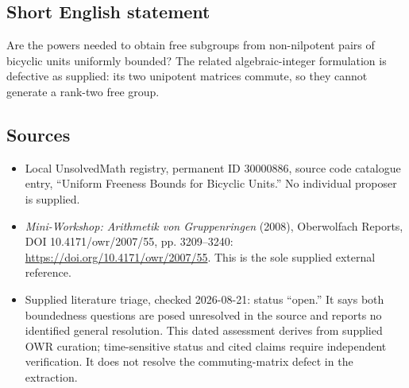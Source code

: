 \documentclass[11pt]{article}
\begin{document}
\subsection{Short English statement}
Are the powers needed to obtain free subgroups from non-nilpotent pairs of bicyclic units uniformly bounded? The related algebraic-integer formulation is defective as supplied: its two unipotent matrices commute, so they cannot generate a rank-two free group.
\subsection{Sources}
\begin{itemize}
\item Local UnsolvedMath registry, permanent ID \(30000886\), source code catalogue entry, ``Uniform Freeness Bounds for Bicyclic Units.'' No individual proposer is supplied.
\item \emph{Mini-Workshop: Arithmetik von Gruppenringen} (2008), Oberwolfach Reports, DOI 10.4171/owr/2007/55, pp. 3209--3240: \url{https://doi.org/10.4171/owr/2007/55}. This is the sole supplied external reference.
\item Supplied literature triage, checked 2026-08-21: status ``open.'' It says both boundedness questions are posed unresolved in the source and reports no identified general resolution. This dated assessment derives from supplied OWR curation; time-sensitive status and cited claims require independent verification. It does not resolve the commuting-matrix defect in the extraction.
\end{itemize}
\end{document}
